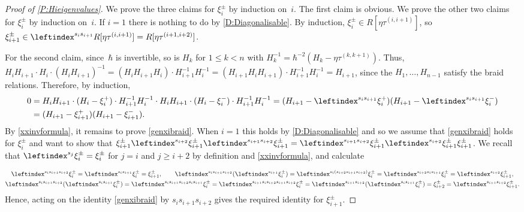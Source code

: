 \documentclass[a4paper,11pt]{amsart}
\numberwithin{equation}{subsection}
\theoremstyle{definition}
\theoremstyle{theorem}
\theoremstyle{remark}
\newcommand\taui[1][i]{\tau^{(#1)}}
\begin{document}
 \begin{proof}[Proof of \autoref{P:Hieigenvalues}] We prove the three claims for ${\xi_{i}^\pm}$ by induction on~$i$. The first claim is obvious. We prove the other two claims for ${\xi_{i}^\pm}$ by induction on~$i$.
   If $i=1$ there is nothing to do by
   \autoref{D:Diagonalisable}. By induction, ${\xi_{i}^\pm}\in R[\eta\taui[i,i+1]]$, so
   ${\xi_{i+1}^\pm}\in\leftindex^{s_is_{i+1}}R[\eta\taui[i,i+1]]=R[\eta\taui[i+1,i+2]]$.

   For the second claim, since~$\hbar$ is invertible, so is $H_k$ for
   $1\le k<n$ with $H_k^{-1}=\hbar^{-2}(H_k-\eta\taui[k,k+1])$. Thus,
   $H_iH_{i+1}\cdot H_i\cdot(H_iH_{i+1})^{-1}
          = (H_iH_{i+1}H_i)\cdot H_{i+1}^{-1}H_i^{-1}
          = (H_{i+1}H_iH_{i+1})\cdot H_{i+1}^{-1}H_i^{-1}
          = H_{i+1}$,
          since the $H_1,\dots,H_{n-1}$ satisfy the braid relations.
   Therefore,  by induction,
   \begin{align*}
     0 &= H_iH_{i+1}\cdot(H_i-{\xi_{i}^{+}})
        \cdot H_{i+1}^{-1}H_i^{-1} \cdot H_iH_{i+1}
        \cdot(H_i-\xi_{i}^{-})\cdot H_{i+1}^{-1}H_i^{-1}
         = (H_{i+1}-\leftindex^{s_is_{i+1}}{{\xi_{i}^{+}}})
         (H_{i+1}-\leftindex^{s_is_{i+1}}{{\xi_{i}^-}})\\
         &= (H_{i+1}-\xi_{i+1}^+)(H_{i+1}-\xi_{i+1}^-).
   \end{align*}
  By \autoref{xxinvformula}, it remains to prove \autoref{genxibraid}.
   When $i=1$ this holds by \autoref{D:Diagonalisable} and so we  assume that \autoref{genxibraid} holds for $\xi_i^\pm$ and want to show that $\xi_{i+1}^\pm\leftindex^{s_{i+2}}{{\xi_{i+1}^\pm}}\leftindex^{s_{i+1}s_{i+2}}{{\xi_{i+1}^\pm}}
    =\leftindex^{s_{i+1}s_{i+2}}{{\xi_{i+1}^\pm}}\leftindex^{s_{i+2}}{{\xi_{i+1}^\pm}}\xi_{i+1}^\pm$.  We recall that
   $\leftindex^{s_j}{{\xi_i^\pm}}=\xi_i^\pm$ for $j=i$ and $j\geq i+2$ by definition and \autoref{xxinvformula}, and calculate

   \begin{equation*}
\begin{gathered}
     \leftindex^{s_is_{i+1}s_{i+2}}{{\xi_i^\pm}}
        =\leftindex^{s_is_{i+1}}{{\xi_i^\pm}} =\xi_{i+1}^\pm,\qquad
     \leftindex^{s_is_{i+1}s_{i+2}}{{(\leftindex^{s_{i+1}}{{\xi_i^\pm}})}}
        = \leftindex^{s_i(s_{i+2}s_{i+1}s_{i+2})}{{\xi_i^\pm}}
         = \leftindex^{s_{i+2}s_is_{i+1}}{{\xi_i^\pm}}
         = \leftindex^{s_{i+2}}{{\xi_{i+1}^\pm}},\\
     \leftindex^{s_is_{i+1}s_{i+2}}{{(\leftindex^{s_is_{i+1}}{{\xi_i^\pm}})}}
        =\leftindex^{s_is_{i+1}s_{i+2}s_is_{i+1}}{{\xi_i^\pm}}
          =\leftindex^{s_{i+1}s_is_{i+2}s_{i+1}s_{i+2}}{{\xi_i^\pm}}
         =\leftindex^{s_{i+1}s_{i+2}}{{(\leftindex^{s_is_{i+1}}{{\xi_i^\pm}})}}
         =\xi_{i+2}^\pm
         =\leftindex^{s_{i+1}s_{i+2}}{{\xi_{i+1}^\pm}}.
\end{gathered}
\end{equation*}
   Hence, acting on the identity \autoref{genxibraid}  by $s_is_{i+1}s_{i+2}$ gives the required identity for
   $\xi_{i+1}^\pm$.
 \end{proof}
\end{document}
